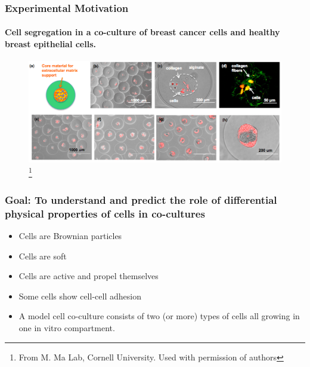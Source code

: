 \documentclass{beamer}
\begin{document}
\begin{frame}
  \end{frame}  
  
  \begin{frame}
    \frametitle{Experimental Motivation}
    \framesubtitle{Cell segregation in a co-culture of breast cancer cells and healthy breast epithelial cells.}
    \begin{figure}
    \includegraphics[width=1.0\textwidth]{experimental.png} \footnote{From M. Ma Lab, Cornell University. Used with permission of authors}
    \end{figure}

    \vfill
  \end{frame}
  
  \begin{frame}
    \frametitle{Goal: To understand and predict the role of differential physical properties of cells in co-cultures}
              
    
  \begin{itemize}    
    \item Cells are Brownian particles
    \item Cells are soft
    \item Cells are active and propel themselves
    \item Some cells show cell-cell adhesion
    \item A model cell co-culture consists of two (or more) types of cells all growing in one in vitro compartment.
  \end {itemize} 
          
  \vfill
    
  \end{frame}  
  
\end{document}
